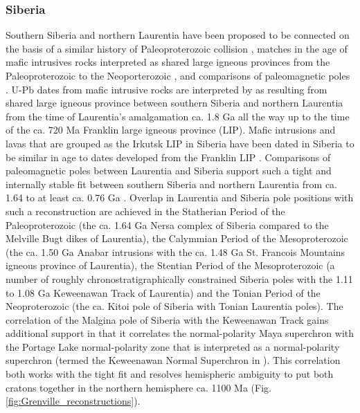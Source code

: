 \documentclass[twocolumn, switch]{article} %
\begin{document}

\subsubsection{Siberia}

Southern Siberia and northern Laurentia have been proposed to be connected on the basis of a similar history of Paleoproterozoic collision \citep{Rainbird1998a}, matches in the age of mafic intrusives rocks interpreted as shared large igneous provinces from the Paleoproterozoic to the Neoporterozoic \cite{Ernst2016a}, and comparisons of paleomagnetic poles \citep{Evans2011a, Evans2016b}. U-Pb dates from mafic intrusive rocks are interpreted by \cite{Ernst2016a} as resulting from shared large igneous province  between southern Siberia and northern Laurentia from the time of Laurentia's amalgamation ca. 1.8 Ga all the way up to the time of the ca. 720 Ma Franklin large igneous province (LIP). Mafic intrusions and lavas that are grouped as the Irkutsk LIP in Siberia have been dated in Siberia to be similar in age to dates developed from the Franklin LIP \citep{Denyszyn2009a, Ernst2016a}. Comparisons of paleomagnetic poles between Laurentia and Siberia support such a tight and internally stable fit between southern Siberia and northern Laurentia from ca. 1.64 to at least ca. 0.76 Ga  \citep{Evans2016b}. Overlap in Laurentia and Siberia pole positions with such a reconstruction are achieved in the Statherian Period of the Paleoproterozoic (the ca. 1.64 Ga Nersa complex of Siberia compared to the Melville Bugt dikes of Laurentia), the Calymmian Period of the Mesoproterozoic (the ca. 1.50 Ga Anabar intrusions with the ca. 1.48 Ga St. Francois Mountains igneous province of Laurentia), the Stentian Period of the Mesoproterozoic (a number of roughly chronostratigraphically constrained Siberia poles with the 1.11 to 1.08 Ga Keweenawan Track of Laurentia) and the Tonian Period of the Neoproterozoic (the ca.  Kitoi pole of Siberia with Tonian Laurentia poles).  The correlation of the Malgina pole of Siberia with the Keweenawan Track gains additional support in that it correlates the normal-polarity Maya superchron \citep{Gallet2012a} with the Portage Lake normal-polarity zone \citep{Swanson-Hysell2019a} that is interpreted as a normal-polarity superchron (termed the Keweenawan Normal Superchron in \citealp{Driscoll2016a}). This correlation both works with the tight fit and resolves hemispheric ambiguity to put both cratons together in the northern hemisphere ca. 1100 Ma (Fig. \ref{fig:Grenville_reconstructions}).
\end{document}
